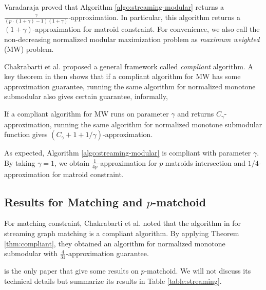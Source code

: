 Varadaraja proved that Algorithm \ref{algo:streaming-modular} returns a $\frac{\gamma}{(p\cdot (1 + \gamma) - 1)(1 + \gamma)}$-approximation. In particular, this algorithm returns a $(1 + \gamma)$-approximation for matroid constraint. For convenience, we also call the non-decreasing normalized modular maximization
problem as \emph{maximum weighted} (MW) problem. 

Chakrabarti et al. \cite{CK14} proposed a general framework called \emph{compliant} algorithm. A key theorem in \cite{CK14} then shows that if a compliant algorithm for MW has some approximation guarantee, running the same algorithm for normalized monotone submodular also gives certain guarantee, informally,
\begin{theorem}
  \label{thm:compliant}
  If a compliant algorithm for MW runs on parameter $\gamma$ and returns $C_{\gamma}$-approximation, running the same algorithm for normalized monotone submodular function gives $(C_{\gamma} + 1 + 1/\gamma)$-approximation.
\end{theorem}

As expected, Algorithm \ref{algo:streaming-modular} is compliant with parameter $\gamma$. By taking $\gamma = 1$, we obtain $\frac{1}{4p}$-approximation for $p$ matroids intersection and $1/4$-approximation for matroid constraint.










\subsection{Results for Matching and $p$-matchoid}
For matching constraint, Chakrabarti et al. \cite{CK14} noted that the algorithm in \cite{Z12} for streaming graph matching is a compliant algorithm. By applying Theorem \ref{thm:compliant}, they obtained an algorithm for normalized monotone submodular with $\frac{4}{31}$-approximation guarantee.

\cite{CGQ15} is the only paper that give some results on $p$-matchoid. We will not discuss its technical details but summarize its results in Table \ref{table:streaming}.